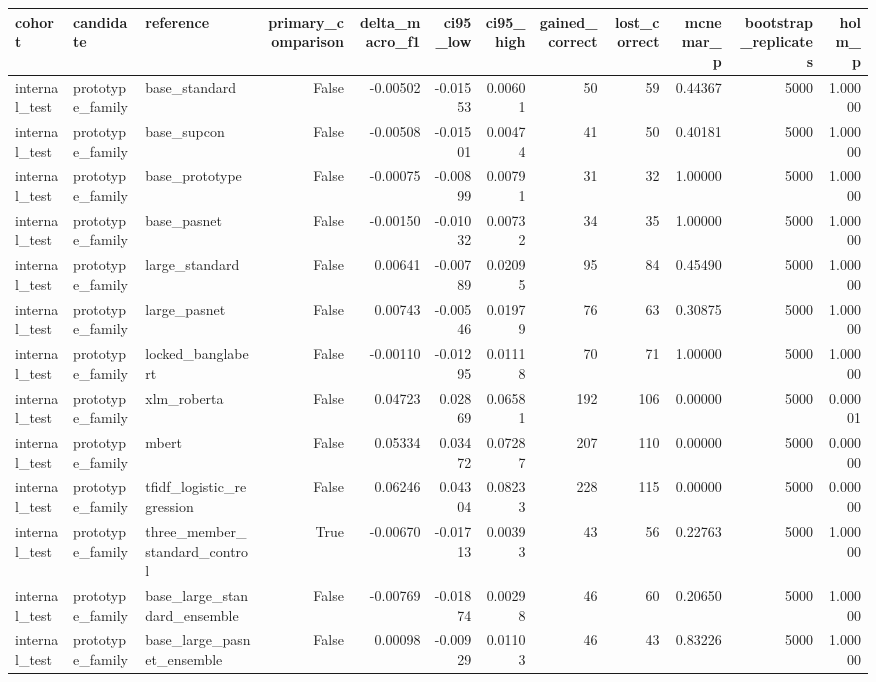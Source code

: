 \begin{tabular}{lllrrrrrrrrr}
\toprule
cohort & candidate & reference & primary\_comparison & delta\_macro\_f1 & ci95\_low & ci95\_high & gained\_correct & lost\_correct & mcnemar\_p & bootstrap\_replicates & holm\_p \\
\midrule
internal\_test & prototype\_family & base\_standard & False & -0.00502 & -0.01553 & 0.00601 & 50 & 59 & 0.44367 & 5000 & 1.00000 \\
internal\_test & prototype\_family & base\_supcon & False & -0.00508 & -0.01501 & 0.00474 & 41 & 50 & 0.40181 & 5000 & 1.00000 \\
internal\_test & prototype\_family & base\_prototype & False & -0.00075 & -0.00899 & 0.00791 & 31 & 32 & 1.00000 & 5000 & 1.00000 \\
internal\_test & prototype\_family & base\_pasnet & False & -0.00150 & -0.01032 & 0.00732 & 34 & 35 & 1.00000 & 5000 & 1.00000 \\
internal\_test & prototype\_family & large\_standard & False & 0.00641 & -0.00789 & 0.02095 & 95 & 84 & 0.45490 & 5000 & 1.00000 \\
internal\_test & prototype\_family & large\_pasnet & False & 0.00743 & -0.00546 & 0.01979 & 76 & 63 & 0.30875 & 5000 & 1.00000 \\
internal\_test & prototype\_family & locked\_banglabert & False & -0.00110 & -0.01295 & 0.01118 & 70 & 71 & 1.00000 & 5000 & 1.00000 \\
internal\_test & prototype\_family & xlm\_roberta & False & 0.04723 & 0.02869 & 0.06581 & 192 & 106 & 0.00000 & 5000 & 0.00001 \\
internal\_test & prototype\_family & mbert & False & 0.05334 & 0.03472 & 0.07287 & 207 & 110 & 0.00000 & 5000 & 0.00000 \\
internal\_test & prototype\_family & tfidf\_logistic\_regression & False & 0.06246 & 0.04304 & 0.08233 & 228 & 115 & 0.00000 & 5000 & 0.00000 \\
internal\_test & prototype\_family & three\_member\_standard\_control & True & -0.00670 & -0.01713 & 0.00393 & 43 & 56 & 0.22763 & 5000 & 1.00000 \\
internal\_test & prototype\_family & base\_large\_standard\_ensemble & False & -0.00769 & -0.01874 & 0.00298 & 46 & 60 & 0.20650 & 5000 & 1.00000 \\
internal\_test & prototype\_family & base\_large\_pasnet\_ensemble & False & 0.00098 & -0.00929 & 0.01103 & 46 & 43 & 0.83226 & 5000 & 1.00000 \\
\bottomrule
\end{tabular}

